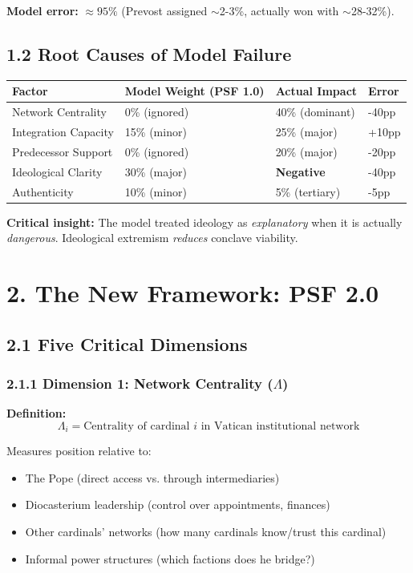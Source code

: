 \textbf{Model error:} $\approx 95\%$ (Prevost assigned $\sim$2-3\%, actually won with $\sim$28-32\%).

\subsection{1.2 Root Causes of Model Failure}

\begin{table}[h]
\centering
\begin{tabular}{|l|l|l|l|}
\hline
\textbf{Factor} & \textbf{Model Weight (PSF 1.0)} & \textbf{Actual Impact} & \textbf{Error} \\
\hline
Network Centrality & 0\% (ignored) & 40\% (dominant) & -40pp \\
Integration Capacity & 15\% (minor) & 25\% (major) & +10pp \\
Predecessor Support & 0\% (ignored) & 20\% (major) & -20pp \\
Ideological Clarity & 30\% (major) & \textbf{Negative} & -40pp \\
Authenticity & 10\% (minor) & 5\% (tertiary) & -5pp \\
\hline
\end{tabular}
\end{table}

\textbf{Critical insight:} The model treated ideology as \textit{explanatory} when it is actually \textit{dangerous}. Ideological extremism \textit{reduces} conclave viability.

\section{2. The New Framework: PSF 2.0}

\subsection{2.1 Five Critical Dimensions}

\subsubsection{2.1.1 Dimension 1: Network Centrality ($\Lambda$)}

\textbf{Definition:}
$$\Lambda_i = \text{Centrality of cardinal } i \text{ in Vatican institutional network}$$

Measures position relative to:
\begin{itemize}
\item The Pope (direct access vs. through intermediaries)
\item Diocasterium leadership (control over appointments, finances)
\item Other cardinals' networks (how many cardinals know/trust this cardinal)
\item Informal power structures (which factions does he bridge?)
\end{itemize}

